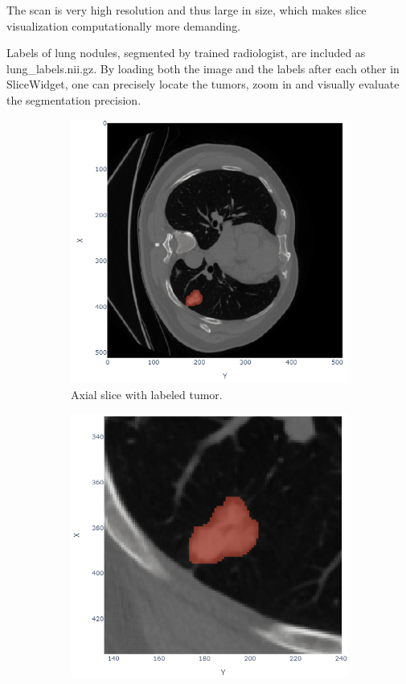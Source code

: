 The scan is very high resolution and thus large in size, which makes slice visualization computationally more demanding.

Labels of lung nodules, segmented by trained radiologist, are included as lung\_labels.nii.gz. By loading both the image and the labels after each other in SliceWidget, one can precisely locate the tumors, zoom in and visually evaluate the segmentation precision.

\begin{figure}[h]
	\centering
	\begin{subfigure}[t]{0.45\linewidth}
		\centering
		\includegraphics[width=\linewidth]{figures/lung_label.png}
		\caption{Axial slice with labeled tumor.}
	\end{subfigure}
	\hfill
	\begin{subfigure}[t]{0.45\linewidth}
		\centering
		\includegraphics[width=\linewidth]{figures/lung_zoom.png}

\end{subfigure}
\end{figure}
